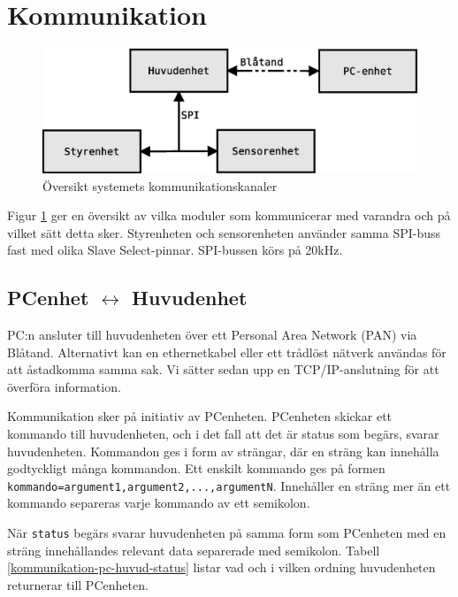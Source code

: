 \section{Kommunikation}

\begin{figure}[h!]
	\centering
	\includegraphics[scale=0.4]{grafik/kommunikation-oversikt}
	\caption{Översikt systemets kommunikationskanaler} \label{kommunikation-oversikt}
\end{figure}

Figur \ref{kommunikation-oversikt} ger en översikt av vilka moduler som kommunicerar med varandra och på vilket sätt detta sker. Styrenheten och sensorenheten använder samma SPI-buss fast med olika Slave Select-pinnar. SPI-bussen körs på 20kHz.

\subsection{PCenhet $\longleftrightarrow$ Huvudenhet}

PC:n ansluter till huvudenheten över ett Personal Area Network (PAN) via Blåtand. Alternativt kan en ethernetkabel eller ett trådlöst nätverk användas för att åstadkomma samma sak. Vi sätter sedan upp en TCP/IP-anslutning för att överföra information.

Kommunikation sker på initiativ av PCenheten. PCenheten skickar ett kommando till huvudenheten, och i det fall att det är status som begärs, svarar huvudenheten. Kommandon ges i form av strängar, där en sträng kan innehålla godtyckligt många kommandon. Ett enskilt kommando ges på formen \texttt{kommando=argument1,argument2,...,argumentN}. Innehåller en sträng mer än ett kommando separeras varje kommando av ett semikolon.

När \texttt{status} begärs svarar huvudenheten på samma form som PCenheten med en sträng innehållandes relevant data separerade med semikolon. Tabell \ref{kommunikation-pc-huvud-status} listar vad och i vilken ordning huvudenheten returnerar till PCenheten.

